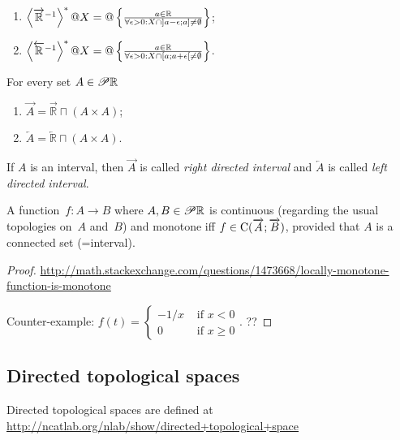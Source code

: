 \begin{xca}~
\begin{enumerate}
\item $\left\langle \overrightarrow{\mathbb{R}}^{-1}\right\rangle ^{\ast}@X = @\left\{ \frac{a\in\mathbb{R}}{\forall\epsilon>0:X\cap]a-\epsilon;a]\ne\emptyset}\right\}$;
\item $\left\langle \overleftarrow{\mathbb{R}}^{-1}\right\rangle ^{\ast}@X = @\left\{ \frac{a\in\mathbb{R}}{\forall\epsilon>0:X\cap[a;a+\epsilon[\ne\emptyset}\right\}$.
\end{enumerate}
\end{xca}

\begin{defn}
For every set $A\in\mathscr{P}\mathbb{R}$
\begin{enumerate}
\item $\overrightarrow{A} = \overrightarrow{\mathbb{R}} \sqcap(A\times A)$;
\item $\overleftarrow{A} = \overleftarrow{\mathbb{R}} \sqcap(A\times A)$.
\end{enumerate}
If $A$ is an interval, then $\overrightarrow{A}$ is called \emph{right directed interval} and $\overleftarrow{A}$ is called \emph{left directed interval}.
\end{defn}

\begin{prop}
A function~$f:A\rightarrow B$ where $A,B\in\mathscr{P}\mathbb{R}$ is continuous (regarding the usual topologies on~$A$ and~$B$) and monotone iff
$f\in\mathrm{C}(\overrightarrow{A};\overrightarrow{B})$, provided that $A$ is a connected set (=interval).
\end{prop}

\begin{proof}
\url{http://math.stackexchange.com/questions/1473668/locally-monotone-function-is-monotone}

Counter-example: $f(t) = \begin{cases}-1/x&\text{ if }x<0\\0&\text{ if }x\ge 0\end{cases}$.
??
\end{proof}

\subsection{Directed topological spaces}

Directed topological spaces are defined at\\
\url{http://ncatlab.org/nlab/show/directed+topological+space}

